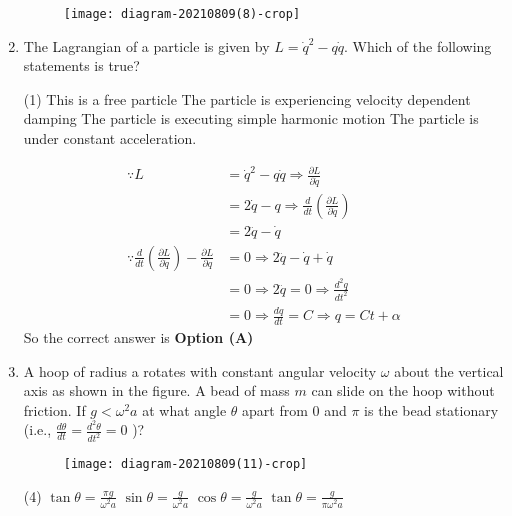 \begin{enumerate}
\begin{answer}
\begin{figure}[H]
	\centering
	\texttt{[image: diagram-20210809(8)-crop]}
\end{figure}
\end{answer}
\item The Lagrangian of a particle is given by $L=\dot{q}^{2}-q \dot{q}$. Which of the following statements is true?
{}
\begin{tasks}(1)
\task[\textbf{A.}]  This is a free particle
\task[\textbf{B.}] The particle is experiencing velocity dependent damping
\task[\textbf{C.}] The particle is executing simple harmonic motion
\task[\textbf{D.}] The particle is under constant acceleration.
\end{tasks}
\begin{answer}
\begin{align*}
\because L&=\dot{q}^{2}-q \dot{q} \Rightarrow \frac{\partial L}{\partial \dot{q}}\\&=2 \dot{q}-q \Rightarrow \frac{d}{d t}\left(\frac{\partial L}{\partial \dot{q}}\right)\\&=2 \ddot{q}-\dot{q}\\
\because \frac{d}{d t}\left(\frac{\partial L}{\partial \dot{q}}\right)-\frac{\partial L}{\partial q}&=0
\Rightarrow 2 \ddot{q}-\dot{q}+\dot{q}\\&=0 \Rightarrow 2 \ddot{q}=0 \Rightarrow \frac{d^{2} q}{d t^{2}}\\&=0 \Rightarrow \frac{d q}{d t}=C \Rightarrow q=C t+\alpha
\end{align*}
So the correct answer is \textbf{Option (A)}
\end{answer}	
\item A hoop of radius a rotates with constant angular velocity $\omega$ about the
vertical axis as shown in the figure. A bead of mass $m$ can slide on the
hoop without friction. If $g<\omega^{2} a$ at what angle $\theta$ apart from 0 and $\pi$ is the bead stationary (i.e., $\frac{d \theta}{d t}=\frac{d^{2} \theta}{d t^{2}}=0$ )?
{}
\begin{figure}[H]
\centering
\texttt{[image: diagram-20210809(11)-crop]}
\caption{}
\label{}
\end{figure}
\begin{tasks}(4)
\task[\textbf{A.}] $\tan \theta=\frac{\pi g}{\omega^{2} a}$
\task[\textbf{B.}] $\sin \theta=\frac{g}{\omega^{2} a}$
\task[\textbf{C.}] $\cos \theta=\frac{g}{\omega^{2} a}$
\task[\textbf{D.}] $\tan \theta=\frac{g}{\pi \omega^{2} a}$
\end{tasks}
\begin{answer}

\end{answer}
\end{enumerate}
